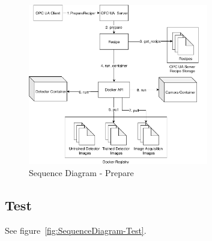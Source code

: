 \begin{figure}[ht]
	\centering
  \includegraphics[width=0.7\textwidth]{img/SequenceDiagram-Prepare.pdf}
	\caption{Sequence Diagram - Prepare}
	\label{fig:SequenceDiagram-Prepare}
\end{figure}

\subsection{Test}
See figure~\ref{fig:SequenceDiagram-Test}.

